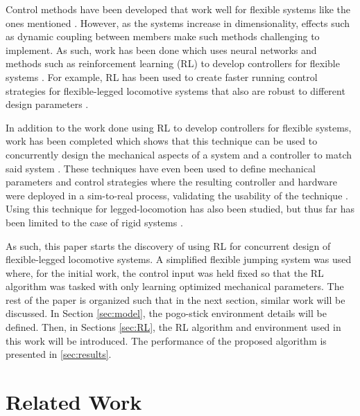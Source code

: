 \documentclass[twocolumn,10pt]{asme2e}
\begin{document}
Control methods have been developed that work well for flexible systems like the ones mentioned \cite{Luo1993, Modeling2003}. However, as the systems increase in dimensionality, effects such as dynamic coupling between members make such methods challenging to implement. As such, work has been done which uses neural networks and methods such as reinforcement learning (RL) to develop controllers for flexible systems \cite{Bhagat2019e, Thuruthelb}. For example, RL has been used to create faster running control strategies for flexible-legged locomotive systems that also are robust to different design parameters \cite{Dwiel2019d}.

In addition to the work done using RL to develop controllers for flexible systems, work has been completed which shows that this technique can be used to concurrently design the mechanical aspects of a system and a controller to match said system \cite{Ha2019j}. These techniques have even been used to define mechanical parameters and control strategies where the resulting controller and hardware were deployed in a sim-to-real process, validating the usability of the technique \cite{Chen2020}. Using this technique for legged-locomotion has also been studied, but thus far has been limited to the case of rigid systems \cite{Schaff2019e}. 

As such, this paper starts the discovery of using RL for concurrent design of flexible-legged locomotive systems. A simplified flexible jumping system was used where, for the initial work, the control input was held fixed so that the RL algorithm was tasked with only learning optimized mechanical parameters. The rest of the paper is organized such that in the next section, similar work will be discussed. In Section \ref{sec:model}, the pogo-stick environment details will be defined. Then, in Sections \ref{sec:RL}, the RL algorithm and environment used in this work will be introduced. The performance of the proposed algorithm is presented in \ref{sec:results}. %

\section{Related Work}
\label{sec:related_work}

\end{document}
